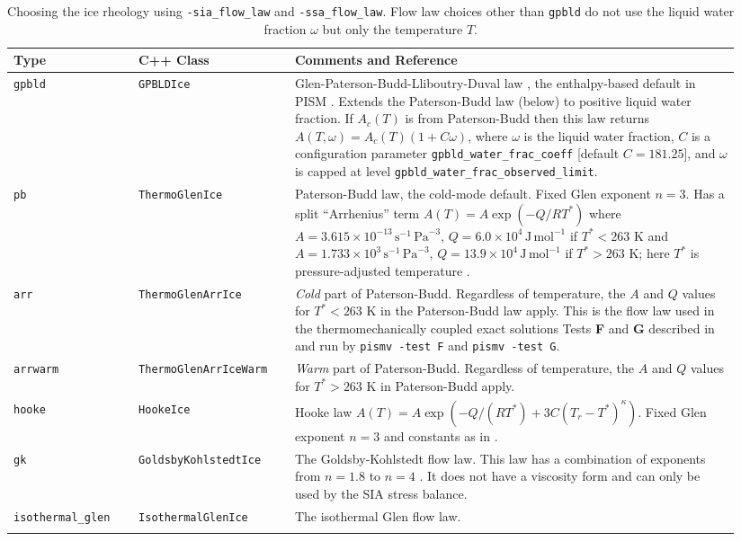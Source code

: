 \begin{table}[ht]
\centering
{}
\small
\begin{tabular}{p{0.16\linewidth}p{0.2\linewidth}p{0.58\linewidth}}\toprule
\textbf{Type} & C++ Class & \textbf{Comments and Reference} \\ \midrule
\texttt{gpbld} &\texttt{GPBLDIce}  & Glen-Paterson-Budd-Lliboutry-Duval law \cite{LliboutryDuval1985}, the enthalpy-based default in PISM \cite{AschwandenBuelerKhroulevBlatter}.  Extends the Paterson-Budd law (below) to positive liquid water fraction.  If $A_{c}(T)$ is from Paterson-Budd then this law returns $A(T,\omega) = A_{c}(T) (1 + C \omega)$, where $\omega$ is the liquid water fraction, $C$ is a configuration parameter \texttt{gpbld_water_frac_coeff} [default $C=181.25$], and $\omega$ is capped at level \texttt{gpbld_water_frac_observed_limit}.  \\  \midrule
\texttt{pb} &\texttt{ThermoGlenIce}  & Paterson-Budd law, the cold-mode default.  Fixed Glen exponent $n=3$.  Has a split ``Arrhenius'' term $A(T) = A \exp(-Q/RT^*)$ where \mbox{$A = 3.615 \times 10^{-13}\, \text{s}^{-1}\, \text{Pa}^{-3}$}, \mbox{$Q = 6.0 \times 10^4\, \text{J}\, \text{mol}^{-1}$} if $T^* < 263$ K and
 \mbox{$A = 1.733 \times 10^{3}\, \text{s}^{-1}\, \text{Pa}^{-3}$}, \mbox{$Q = 13.9 \times 10^4\, \text{J}\, \text{mol}^{-1}$} if $T^* > 263$ K; here $T^*$ is pressure-adjusted temperature \cite{PatersonBudd}. \\
\texttt{arr} &  \texttt{ThermoGlenArrIce} & \emph{Cold} part of Paterson-Budd.  Regardless of temperature, the $A$ and $Q$ values for $T^*<263$ K in  the Paterson-Budd law apply.  This is the flow law used in the thermomechanically coupled exact solutions Tests \textbf{F} and \textbf{G} described in \cite{BBL,BB} and run by \texttt{pismv -test F} and \texttt{pismv -test G}. \\
\texttt{arrwarm} & \texttt{ThermoGlenArrIceWarm} & \emph{Warm} part of Paterson-Budd.  Regardless of temperature, the $A$ and $Q$ values for $T^*>263$ K in Paterson-Budd apply.\\
\texttt{hooke} & \texttt{HookeIce} & Hooke law \mbox{$A(T) = A \exp(-Q/(RT^*) + 3C (T_r - T^*)^\kappa)$.}  Fixed Glen exponent $n=3$ and constants as in \cite{Hooke,PayneBaldwin}.\\
\texttt{gk} & \texttt{GoldsbyKohlstedtIce} & The  Goldsby-Kohlstedt flow law.  This law has a combination of exponents  from $n=1.8$ to $n=4$ \cite{GoldsbyKohlstedt}. It does not have a viscosity form and can only be used by the SIA stress balance. \\
\texttt{isothermal_glen} &  \texttt{IsothermalGlenIce} &The isothermal Glen flow law. \\
\bottomrule
\normalsize	
\end{tabular}
\caption{Choosing the ice rheology using \texttt{-sia_flow_law} and \texttt{-ssa_flow_law}.  Flow law choices other than \texttt{gpbld} do not use the liquid water fraction $\omega$ but only the temperature $T$.}
\label{tab:flowlaw}
\end{table}


